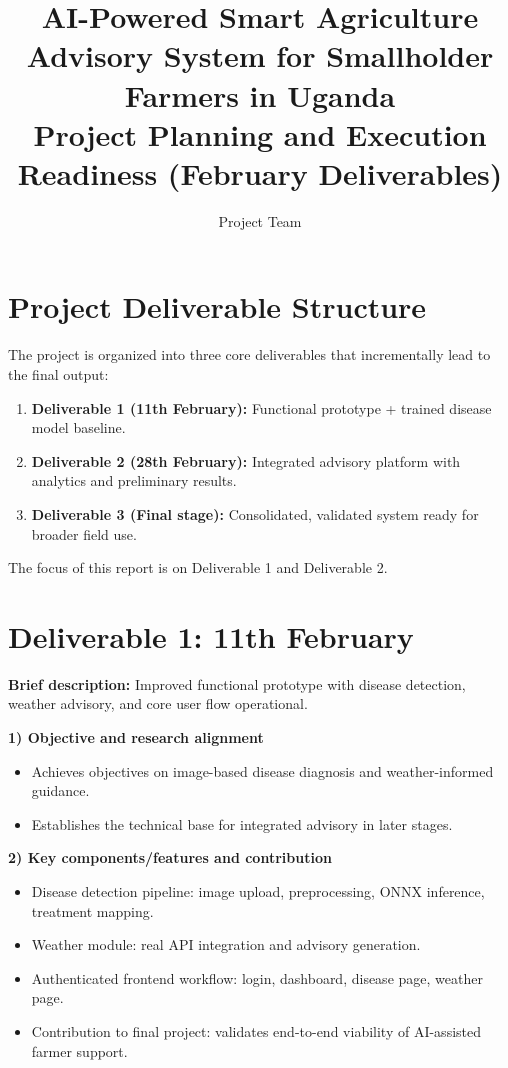 \documentclass[10pt,a4paper]{article}
\title{\textbf{AI-Powered Smart Agriculture Advisory System for Smallholder Farmers in Uganda}\\
\large Project Planning and Execution Readiness (February Deliverables)}
\author{Project Team}
\date{}
\begin{document}
\maketitle

\section*{Project Deliverable Structure}
The project is organized into three core deliverables that incrementally lead to the final output:
\begin{enumerate}[noitemsep]
  \item \textbf{Deliverable 1 (11th February):} Functional prototype + trained disease model baseline.
  \item \textbf{Deliverable 2 (28th February):} Integrated advisory platform with analytics and preliminary results.
  \item \textbf{Deliverable 3 (Final stage):} Consolidated, validated system ready for broader field use.
\end{enumerate}

The focus of this report is on Deliverable 1 and Deliverable 2.

\section*{Deliverable 1: 11th February}
\textbf{Brief description:} Improved functional prototype with disease detection, weather advisory, and core user flow operational.

\textbf{1) Objective and research alignment}
\begin{itemize}[noitemsep]
  \item Achieves objectives on image-based disease diagnosis and weather-informed guidance.
  \item Establishes the technical base for integrated advisory in later stages.
\end{itemize}

\textbf{2) Key components/features and contribution}
\begin{itemize}[noitemsep]
  \item Disease detection pipeline: image upload, preprocessing, ONNX inference, treatment mapping.
  \item Weather module: real API integration and advisory generation.
  \item Authenticated frontend workflow: login, dashboard, disease page, weather page.
  \item Contribution to final project: validates end-to-end viability of AI-assisted farmer support.
\end{itemize}
\end{document}
